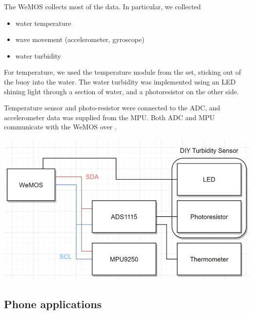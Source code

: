 \documentclass{article}
\begin{document}
\begin{multicols}{2}

The WeMOS collects most of the data. In particular, we collected

\begin{itemize}
    \item water temperature
    \item wave movement (accelerometer, gyroscope)
    \item water turbidity
\end{itemize}

For temperature, we used the temperature  module from the set, sticking out of the buoy into the water. The water turbidity was implemented using an LED shining light through a section of water, and a photoresistor on the other side.

Temperature sensor and photo-resistor were connected to the ADC, and accelerometer data was supplied from the MPU. Both ADC and MPU communicate with the WeMOS over \ISquaredC.

\includegraphics[width=\columnwidth]{report/images/wiring.png}

\end{multicols}

\subsection{Phone applications}
\end{document}

